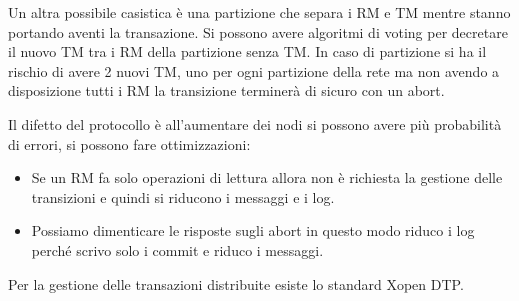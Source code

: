 Un altra possibile casistica è una partizione che separa i RM e TM mentre stanno
portando aventi la transazione. Si possono avere algoritmi di voting per decretare
il nuovo TM tra i RM della partizione senza TM. In caso di partizione si
ha il rischio di avere 2 nuovi TM, uno per ogni partizione della rete ma non
avendo a disposizione tutti i RM la transizione terminerà di sicuro con un abort.

Il difetto del protocollo è all'aumentare dei nodi si possono avere più probabilità
di errori, si possono fare ottimizzazioni:
\begin{itemize}
      \item Se un RM fa solo operazioni di lettura allora non è richiesta la
            gestione delle transizioni e quindi si riducono i messaggi e i log.
      \item Possiamo dimenticare le risposte sugli abort in questo modo riduco
            i log perché scrivo solo i commit e riduco i messaggi.
\end{itemize}

Per la gestione delle transazioni distribuite esiste lo standard Xopen DTP.